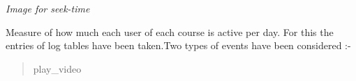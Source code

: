 \documentclass[a4paper,12pt,oneside]{sphinxmanual}
\begin{document}
\emph{Image for seek-time}
\begin{figure}[htbp]
\centering

\end{figure}

\begin{DUlineblock}{0em}
\item[] Measure of how much each user of each course is active per day. For this the entries of log tables have been taken.Two types of events have been considered :-
\end{DUlineblock}
\begin{quote}\begin{description}
\item[{play\_video}] \leavevmode
\end{description}\end{quote}
\end{document}
